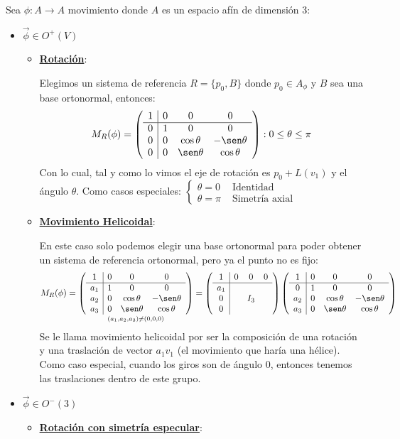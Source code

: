 \documentclass[10pt,a4paper,openright]{book}
\theoremstyle{break}
\begin{document}
Sea $\phi : A\rightarrow A$ movimiento donde $A$ es un espacio afín de dimensión 3:
\begin{itemize}
\item $\vec{\phi} \in O^+(V)$
	\begin{itemize}
	\item \underline{\textbf{Rotación}}: 
	
	Elegimos un sistema de referencia $R=\{p_0, B\}$ donde $p_0 \in A_\phi$ y $B$ sea una base ortonormal, entonces:
	$$M_R (\phi) = \left(\begin{array}{c|ccc}
1 & 0  & 0 & 0 \\
\hline
0 & 1 &  0& 0    \\
0 & 0 &  \cos\theta  & -\sen\theta \\
0 & 0 &  \sen\theta & \cos\theta 
\end{array}
\right) : 0 \leq \theta \leq \pi$$
Con lo cual, tal y como lo vimos el eje de rotación es $p_0 + L(v_1)$ y el ángulo $\theta$. Como casos especiales: $\begin{cases} \theta = 0 & \mbox{ Identidad } \\ \theta = \pi & \mbox{ Simetría axial } \end{cases}$

\item \underline{\textbf{Movimiento Helicoidal}}: 

En este caso solo podemos elegir una base ortonormal para poder obtener un sistema de referencia ortonormal, pero ya el punto no es fijo:
$$M_R (\phi) = \underset{(a_1, a_2, a_3) \neq (0,0,0)}{\left(\begin{array}{c|ccc}
1 & 0  & 0 & 0 \\
\hline
a_1 & 1 &  0& 0    \\
a_2 & 0 &  \cos\theta  & -\sen\theta \\
a_3 & 0 &  \sen\theta & \cos\theta 
\end{array}
\right)} =
\left(\begin{array}{c|ccc}
1 & 0  & 0 & 0 \\
\hline
a_1 &  &  &     \\
0 & & I_3   &  \\
0 &  &   &  
\end{array}
\right)\left(\begin{array}{c|ccc}
1 & 0  & 0 & 0 \\
\hline
0 & 1 &  0& 0    \\
a_2 & 0 &  \cos\theta  & -\sen\theta \\
a_3 & 0 &  \sen\theta & \cos\theta 
\end{array}
\right)$$
Se le llama movimiento helicoidal por ser la composición de una rotación y una traslación de vector $a_1 v_1$ (el movimiento que haría una hélice). Como caso especial, cuando los giros son de ángulo 0, entonces tenemos las traslaciones dentro de este grupo.
\end{itemize}
\newpage
\item $\vec{\phi} \in O^-(3)$
\begin{itemize}
\item \underline{\textbf{Rotación con simetría especular}}: 


\end{itemize}
\end{itemize}
\end{document}
